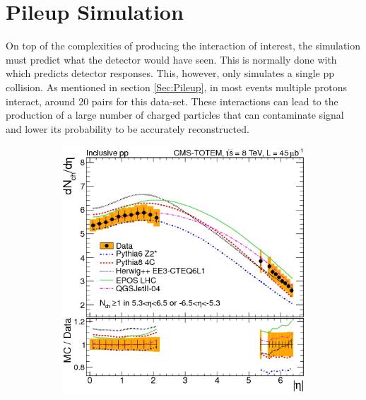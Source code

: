\section{Pileup Simulation}
\label{Sec:SimRecon}
On top of the complexities of producing the interaction of interest, the simulation must predict what the detector would have seen. This is normally done with \GEANTfour \cite{agostinelli2003} which predicts detector responses. This, however, only simulates a single pp collision. As mentioned in section \ref{Sec:Pileup}, in most events multiple protons interact, around 20 pairs for this data-set. These interactions can lead to the production of a large number of charged particles that can contaminate signal and lower its probability to be accurately reconstructed. 
\begin{figure}
    \centering
    \begin{subfigure}[b]{\SideBySidePlotWidth} 
        \includegraphics[width=\linewidth]{figures/Simulation/EtaPileupDist.png}
        \caption{}
    \end{subfigure}%
    \begin{subfigure}[b]{1.\SideBySidePlotWidth}

\end{subfigure}
\end{figure}
